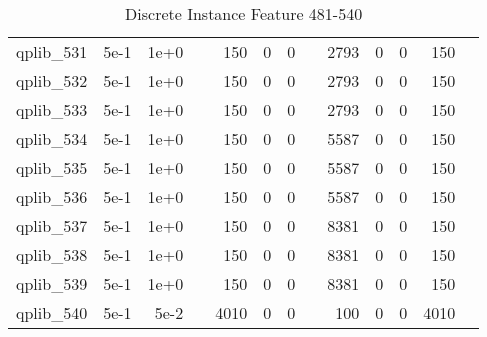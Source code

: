 \begin{table}
\begin{tabular}{lrrrrrrrrrrrr}
qplib\_531	&	5e-1	&	1e+0	&	&	150	&	0	&	0	&	&	2793	&	0	&	0	&	150	\\
qplib\_532	&	5e-1	&	1e+0	&	&	150	&	0	&	0	&	&	2793	&	0	&	0	&	150	\\
qplib\_533	&	5e-1	&	1e+0	&	&	150	&	0	&	0	&	&	2793	&	0	&	0	&	150	\\
qplib\_534	&	5e-1	&	1e+0	&	&	150	&	0	&	0	&	&	5587	&	0	&	0	&	150	\\
qplib\_535	&	5e-1	&	1e+0	&	&	150	&	0	&	0	&	&	5587	&	0	&	0	&	150	\\
qplib\_536	&	5e-1	&	1e+0	&	&	150	&	0	&	0	&	&	5587	&	0	&	0	&	150	\\
qplib\_537	&	5e-1	&	1e+0	&	&	150	&	0	&	0	&	&	8381	&	0	&	0	&	150	\\
qplib\_538	&	5e-1	&	1e+0	&	&	150	&	0	&	0	&	&	8381	&	0	&	0	&	150	\\
qplib\_539	&	5e-1	&	1e+0	&	&	150	&	0	&	0	&	&	8381	&	0	&	0	&	150	\\
qplib\_540	&	5e-1	&	5e-2	&	&	4010	&	0	&	0	&	&	100	&	0	&	0	&	4010	\\


\bottomrule

\end{tabular}  
\label{tab:A9}
\caption{Discrete  Instance Feature 481-540} 

\end{table}

